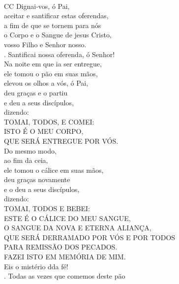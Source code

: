\documentclass{book}
\begin{document}
\begin{flushleft}
    \vspace{.1cm} \\
    {\color{red}CC} Dignai-vos, ó Pai, \\
    aceitar e santificar estas oferendas, \\
    a fim de que se tornem para nós \\
    o Corpo e o Sangue de jesus Cristo, \\
    vosso Filho e Senhor nosso.
    \vspace{.1cm} \\
    {\color{red} \Rbar.} Santificai nossa oferenda, ó Senhor!
    \vspace{.1cm} \\
    Na noite em que ia ser entregue, \\
    ele tomou o pão em suas mãos, \\
    elevou os olhos a vós, ó Pai, \\
    deu graças e o partiu \\
    e deu a seus discípulos, \\
    dizendo:
    \vspace{.1cm} \\
    TOMAI, TODOS, E COMEI: \\
    ISTO É O MEU CORPO, \\
    QUE SERÁ ENTREGUE POR VÓS.
    \vspace{.1cm} \\
    Do mesmo modo, \\
    ao fim da ceia, \\
    ele tomou o cálice em suas mãos, \\
    deu graças novamente \\
    e o deu a seus discípulos, \\
    dizendo:
    \vspace{.1cm} \\
    TOMAI, TODOS E BEBEI: \\
    ESTE É O CÁLICE DO MEU SANGUE, \\
    O SANGUE DA NOVA E ETERNA ALIANÇA, \\
    QUE SERÁ DERRAMADO POR VÓS E POR TODOS \\
    PARA REMISSÃO DOS PECADOS. \\
    FAZEI ISTO EM MEMÓRIA DE MIM.
    \vspace{.1cm} \\
    Eis o mistério dda fé!
    \vspace{.1cm} \\
    {\color{red} \Rbar.} Todas as vezes que comemos deste pão \\

\end{flushleft}
\end{document}
